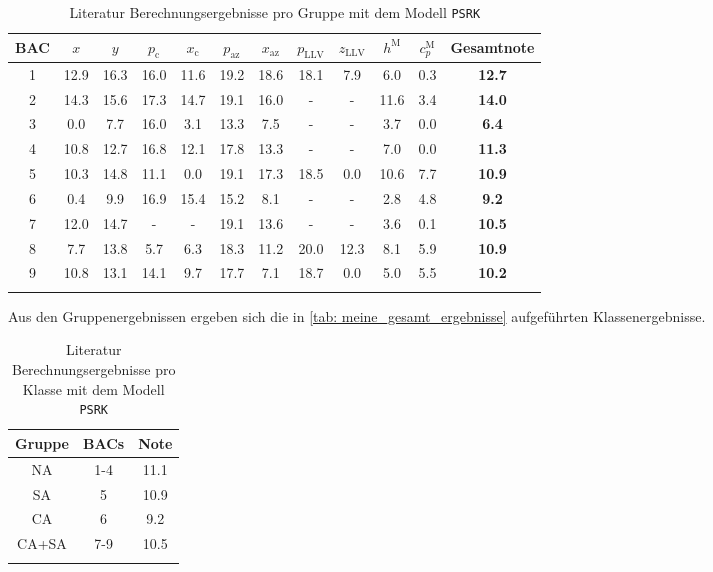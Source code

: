 \documentclass[../thesis.tex]{subfiles}
\begin{document}
\begin{table} [htb]
	\centering
	\caption{Literatur Berechnungsergebnisse pro Gruppe mit dem Modell \texttt{PSRK}}
	\begin{tabular}{ cccccccccccc }
		\hline
		BAC & $ x $ & $ y $ & $ p_\mathrm{c}$ & $ x_\mathrm{c}$ & $ p_\mathrm{az}$ & $ x_\mathrm{az}$ & $ p_\mathrm{LLV}$ & $ z_\mathrm{LLV}$ & $ h^\mathrm{M} $ & $ c_p^\mathrm{M} $ & \textbf{Gesamtnote} \\
		\hline
		1 & 12.9 & 16.3 & 16.0  & 11.6  & 19.2  & 18.6 & 18.1 & 7.9  & 6.0  & 0.3 & \textbf{12.7}\\
		2 & 14.3 & 15.6 & 17.3  & 14.7  & 19.1  & 16.0 & -    & -    & 11.6 & 3.4 & \textbf{14.0}\\
		3 & 0.0  & 7.7  & 16.0  & 3.1   & 13.3  & 7.5  & -    & -    & 3.7  & 0.0 & \textbf{6.4}\\
		4 & 10.8 & 12.7 & 16.8  & 12.1  & 17.8  & 13.3 & -    & -    & 7.0  & 0.0 & \textbf{11.3}\\
		5 & 10.3 & 14.8 & 11.1  & 0.0   & 19.1  & 17.3 & 18.5 & 0.0  & 10.6 & 7.7 & \textbf{10.9}\\
		6 & 0.4  & 9.9  & 16.9  & 15.4  & 15.2  & 8.1  & -    & -    & 2.8  & 4.8 & \textbf{9.2}\\
		7 & 12.0 & 14.7 & -     & -     & 19.1  & 13.6 & -    & -    & 3.6  & 0.1 & \textbf{10.5}\\
		8 & 7.7  & 13.8 & 5.7   & 6.3   & 18.3  & 11.2 & 20.0 & 12.3 & 8.1  & 5.9 & \textbf{10.9}\\
		9 & 10.8 & 13.1 & 14.1  & 9.7   & 17.7  & 7.1  & 18.7 & 0.0  & 5.0  & 5.5 & \textbf{10.2}\\
		\hline
		\label{tab: PSRK benchmark literatur bac}
	\end{tabular}
\end{table}

Aus den Gruppenergebnissen ergeben sich die in \autoref{tab: meine_gesamt_ergebnisse} aufgeführten Klassenergebnisse.

\begin{table} [htb]
	\centering
	\caption{Literatur Berechnungsergebnisse pro Klasse mit dem Modell \texttt{PSRK}}
	\begin{tabular}{ ccc }
		\hline
		Gruppe & BACs & Note  \\
		\hline
		NA & 1-4 & 11.1 \\
		SA & 5   & 10.9 \\
		CA & 6   & 9.2 \\
		CA+SA & 7-9 & 10.5 \\ 
		\hline
		\label{tab: PSRK benchmark literatur gruppen}
	\end{tabular}
\end{table}
\end{document}
